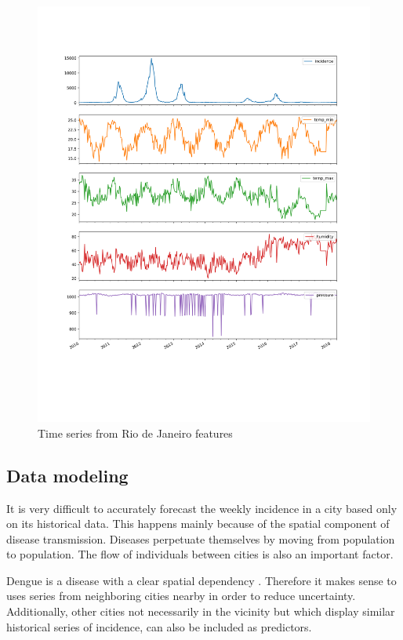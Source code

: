 \documentclass[12pt]{report}
\begin{document}
\begin{figure}[h!]
 \centering
 \includegraphics[width=\textwidth]{rio_raw_series.png}
 \caption{Time series from Rio de Janeiro features}
 \label{fig: rio_raw}
\end{figure}


\subsection{Data modeling}

It is very difficult to accurately forecast the weekly incidence in a city based only on its historical data. This happens mainly because of the spatial component of disease transmission. Diseases perpetuate themselves by moving from population to population. The flow of individuals between cities is also an important factor.

Dengue is a disease with a clear spatial dependency \citep{stoddard2013house,eisen2009use}. Therefore it makes sense to uses series from neighboring cities nearby in order to reduce uncertainty. Additionally, other cities not necessarily in the vicinity but which display similar historical series of incidence, can also be included as predictors.
\end{document}
